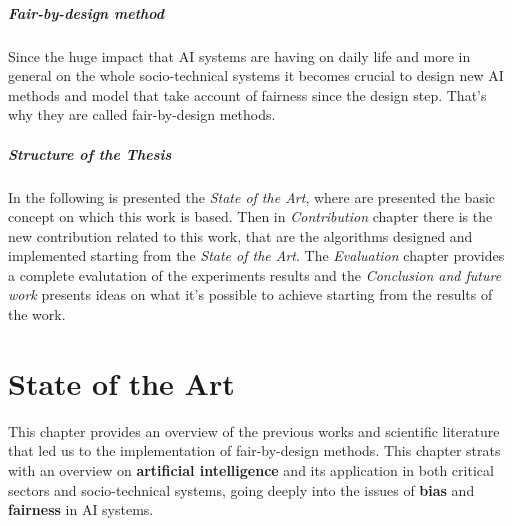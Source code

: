 \documentclass[12pt,a4paper,openright,twoside]{book}
\begin{document}
\paragraph{Fair-by-design method}
Since the huge impact that AI systems are having on daily life and more in general on the whole socio-technical systems it becomes crucial to design new AI methods and model that take account of fairness since the design step. That's why they are called fair-by-design methods.

\paragraph{Structure of the Thesis}
In the following is presented the \emph{State of the Art}, where are presented the basic concept on which this work is based. Then in \emph{Contribution} chapter there is the new contribution related to this work, that are the algorithms designed and implemented starting from the \emph{State of the Art}. The \emph{Evaluation} chapter provides a complete evalutation of the experiments results and the \emph{Conclusion and future work} presents ideas on what it's possible to achieve starting from the results of the work.
\chapter{State of the Art} %
\label{chap:background}

This chapter provides an overview of the previous works and scientific literature that led us to the implementation of fair-by-design methods. This chapter strats
with an overview on \textbf{artificial intelligence} and its application in both critical sectors and socio-technical systems, going deeply into the issues of \textbf{bias} and \textbf{fairness} in AI systems.
\end{document}
